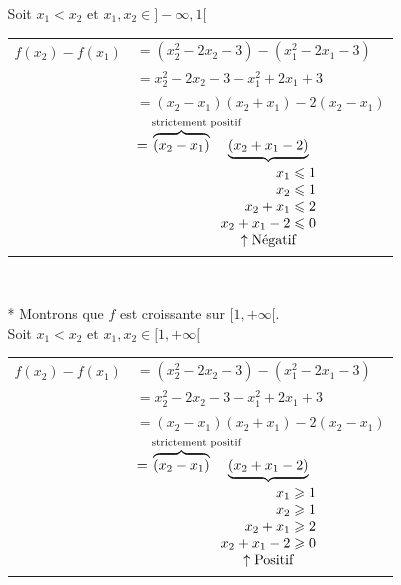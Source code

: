 \begin{enumerate}
\begin{itemize}
Soit $x_1 < x_2 \text{ et }  x_1, x_2 \in  ]-\infty, 1[  $   \\    

\begin{tabular}{r@{}l}
$f(x_2) -f(x_1) $ & $= (x^{2}_2 -2x_2 -3) - (x^{2}_1 -2x_1 -3)$ \\
                  & $= x^{2}_2 -2x_2 -3 - x^{2}_1 + 2x_1 +3$ \\
                  & $= (x_2 - x_1) (x_2 + x_1) -2 (x_2 - x_1) $ \\                  
                  & $=\overbrace{(x_2 - x_1)}^\text{\makebox[1.5cm][l]{strictement positif}}
    \underbrace{(x_2 + x_1 -2 )}_{\begin{array}{r@{\;\leqslant\;}l}
                                       x_1 & 1 \\
                                       x_2 & 1 \\
                                  x_2 + x_1 & 2 \\
                                x_2 +x_1 -2 & 0 \\
                       \multicolumn{2}{c}{\uparrow\text{Négatif}}\\
                                    \end{array}
                                  }
    $
  \\
\end{tabular}\\

\item [*] Montrons que $f$ est croissante sur $[1, +\infty[ $.\\

Soit $x_1 < x_2 \text{ et }  x_1, x_2 \in  [1,+\infty[  $   \\    

\begin{tabular}{r@{}l}
$f(x_2) -f(x_1) $ & $= (x^{2}_2 -2x_2 -3) - (x^{2}_1 -2x_1 -3)$ \\
                  & $= x^{2}_2 -2x_2 -3 - x^{2}_1 + 2x_1 +3$ \\
                  & $= (x_2 - x_1) (x_2 + x_1) -2 (x_2 - x_1) $ \\                  
                  & $=\overbrace{(x_2 - x_1)}^\text{\makebox[1.5cm][l]{strictement positif}}
    \underbrace{(x_2 + x_1 -2 )}_{\begin{array}{r@{\;\geqslant\;}l}
                                       x_1 & 1 \\
                                       x_2 & 1 \\
                                  x_2 + x_1 & 2 \\
                                x_2 +x_1 -2 & 0 \\
                       \multicolumn{2}{c}{\uparrow\text{Positif}}\\
                                    \end{array}
                                  }
    $
  \\
\end{tabular}      \\   
\end{itemize}


\end{enumerate}
